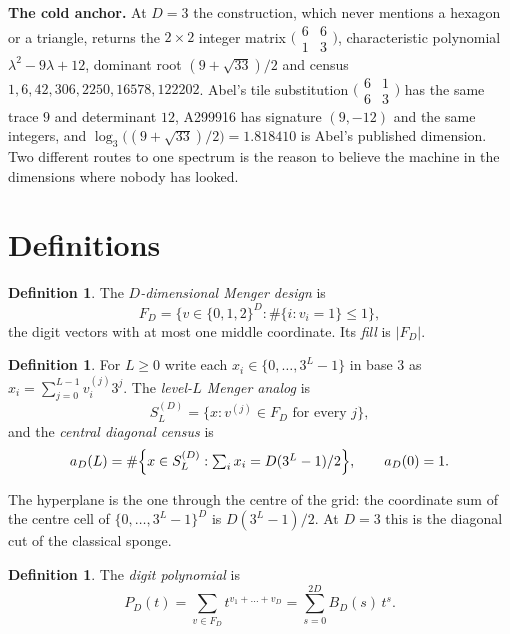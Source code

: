 \documentclass[11pt]{amsart}
\theoremstyle{definition}
\newtheorem{definition}[theorem]{Definition}
\theoremstyle{remark}
\begin{document}
\medskip
\noindent\textbf{The cold anchor.} At $D = 3$ the construction, which never mentions a hexagon or a triangle, returns the $2 \times 2$ integer matrix $\bigl(\begin{smallmatrix} 6 & 6 \\ 1 & 3 \end{smallmatrix}\bigr)$, characteristic polynomial $\lambda^2 - 9\lambda + 12$, dominant root $(9+\sqrt{33})/2$ and census $1, 6, 42, 306, 2250, 16578, 122202$. Abel's tile substitution $\bigl(\begin{smallmatrix} 6 & 1 \\ 6 & 3 \end{smallmatrix}\bigr)$ \cite{abelstars} has the same trace $9$ and determinant $12$, A299916 has signature $(9,-12)$ and the same integers, and $\log_3\bigl((9+\sqrt{33})/2\bigr) = 1.818410$ is Abel's published dimension. Two different routes to one spectrum is the reason to believe the machine in the dimensions where nobody has looked.

\section{Definitions}

\begin{definition}
\label{def:design}
The \emph{$D$-dimensional Menger design} is
\[
F_D = \bigl\{ v \in \{0,1,2\}^D : \#\{ i : v_i = 1 \} \le 1 \bigr\},
\]
the digit vectors with at most one middle coordinate. Its \emph{fill} is $\lvert F_D \rvert$.
\end{definition}

\begin{definition}
\label{def:level}
For $L \ge 0$ write each $x_i \in \{0,\dots,3^L-1\}$ in base $3$ as $x_i = \sum_{j=0}^{L-1} v^{(j)}_i 3^j$. The \emph{level-$L$ Menger analog} is
\[
S_L^{(D)} = \bigl\{ x : v^{(j)} \in F_D \text{ for every } j \bigr\},
\]
and the \emph{central diagonal census} is
\[
a_D(L) = \#\Bigl\{ x \in S_L^{(D)} : \textstyle\sum_i x_i = D(3^L-1)/2 \Bigr\}, \qquad a_D(0) = 1.
\]
\end{definition}

The hyperplane is the one through the centre of the grid: the coordinate sum of the centre cell of $\{0,\dots,3^L-1\}^D$ is $D(3^L-1)/2$. At $D = 3$ this is the diagonal cut of the classical sponge.

\begin{definition}
\label{def:poly}
The \emph{digit polynomial} is
\[
P_D(t) = \sum_{v \in F_D} t^{v_1+\dots+v_D} = \sum_{s=0}^{2D} B_D(s)\, t^s .
\]
\end{definition}
\end{document}
